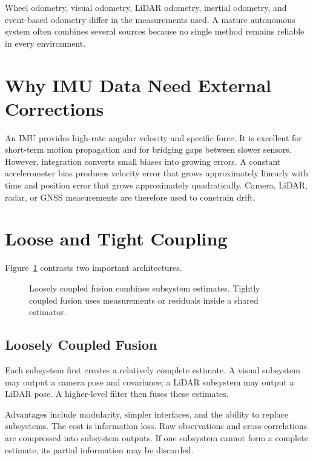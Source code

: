 Wheel odometry, visual odometry, LiDAR odometry, inertial odometry, and event-based odometry differ in the measurements used. A mature autonomous system often combines several sources because no single method remains reliable in every environment.

\section{Why IMU Data Need External Corrections}

An IMU provides high-rate angular velocity and specific force. It is excellent for short-term motion propagation and for bridging gaps between slower sensors. However, integration converts small biases into growing errors. A constant accelerometer bias produces velocity error that grows approximately linearly with time and position error that grows approximately quadratically. Camera, LiDAR, radar, or GNSS measurements are therefore used to constrain drift.

\section{Loose and Tight Coupling}

Figure~\ref{fig:loose-tight} contrasts two important architectures.

\begin{figure}[H]
    \centering
    \resizebox{\textwidth}{!}{}
    \caption{Loosely coupled fusion combines subsystem estimates. Tightly coupled fusion uses measurements or residuals inside a shared estimator.}
    \label{fig:loose-tight}
\end{figure}

\subsection{Loosely Coupled Fusion}

Each subsystem first creates a relatively complete estimate. A visual subsystem may output a camera pose and covariance; a LiDAR subsystem may output a LiDAR pose. A higher-level filter then fuses these estimates.

Advantages include modularity, simpler interfaces, and the ability to replace subsystems. The cost is information loss. Raw observations and cross-correlations are compressed into subsystem outputs. If one subsystem cannot form a complete estimate, its partial information may be discarded.

